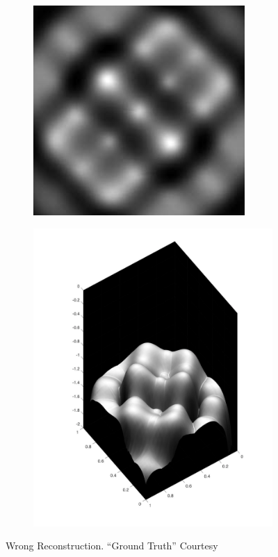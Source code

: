\documentclass{article}[11pt]
\begin{document}
\begin{center}
\begin{figure}[h!]
\begin{subfigure}{0.5\textwidth}
		\centering
		\includegraphics[scale = 1]{thing.png}
	\end{subfigure}
	\begin{subfigure}{0.5\textwidth}
		\centering
		\includegraphics[scale = 0.3]{thing2.png}
	\end{subfigure}
	\caption{Wrong Reconstruction. ``Ground Truth'' Courtesy \cite{prados}}
\end{figure}
\end{center}
\end{document}
